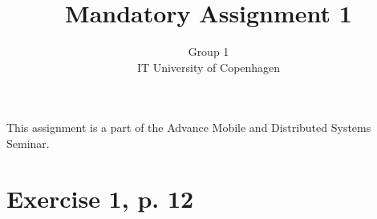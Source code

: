 \documentclass[11pt]{article}
\begin{document}
\title{Mandatory Assignment 1}
\author{Group 1\\
IT University of Copenhagen}
\renewcommand{\today}{September 22, 2012}
\maketitle
This assignment is a part of the Advance Mobile and Distributed Systems Seminar.

\section {Exercise 1, p. 12}



\end{document}
